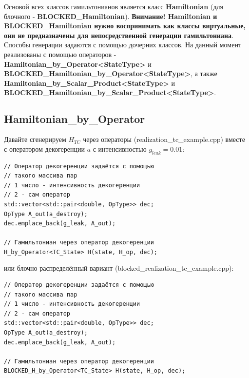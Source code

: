 \documentclass[12pt,fleqn]{article}
\begin{document}
        Основой всех классов гамильтонианов является класс \textbf{Hamiltonian} (для блочного - \textbf{BLOCKED\_Hamiltonian}).
        \textbf{Внимание! Hamiltonian и BLOCKED\_Hamiltonian нужно воспринимать как классы виртуальные, 
        они не предназначены для непосредственной генерации гамильтониана}. Способы генерации задаются с помощью дочерних классов. На данный момент реализованы с помощью операторов - \newline
        \textbf{Hamiltonian\_by\_Operator<StateType>} и \newline \textbf{BLOCKED\_Hamiltonian\_by\_Operator<StateType>},
        а также \newline \textbf{Hamiltonian\_by\_Scalar\_Product<StateType>} и \newline \textbf{BLOCKED\_Hamiltonian\_by\_Scalar\_Product<StateType>}.

        \subsection{\textbf{Hamiltonian\_by\_Operator}}

        Давайте сгенерируем $H_{TC}$ через операторы (\textsf{realization\_tc\_example.cpp}) вместе с оператором декогеренции $a$ с интенсивностью $g_{leak} = 0.01$:

\begin{mdframed}[linecolor=black, topline=true, bottomline=true,
leftline=false, rightline=false]
\begin{verbatim}
// Оператор декогеренции задаётся с помощью 
// такого массива пар
// 1 число - интенсивность декогеренции
// 2 - сам оператор
std::vector<std::pair<double, OpType>> dec;
OpType A_out(a_destroy);
dec.emplace_back(g_leak, A_out);

// Гамильтониан через оператор декогеренции
H_by_Operator<TC_State> H(state, H_op, dec);
\end{verbatim}
\end{mdframed}

        или блочно-распределённый вариант (\textsf{blocked\_realization\_tc\_example.cpp}):

\begin{mdframed}[linecolor=black, topline=true, bottomline=true,
leftline=false, rightline=false]
\begin{verbatim}
// Оператор декогеренции задаётся с помощью 
// такого массива пар
// 1 число - интенсивность декогеренции
// 2 - сам оператор
std::vector<std::pair<double, OpType>> dec;
OpType A_out(a_destroy);
dec.emplace_back(g_leak, A_out);

// Гамильтониан через оператор декогеренции
BLOCKED_H_by_Operator<TC_State> H(state, H_op, dec);
\end{verbatim}
\end{mdframed}
\end{document}
